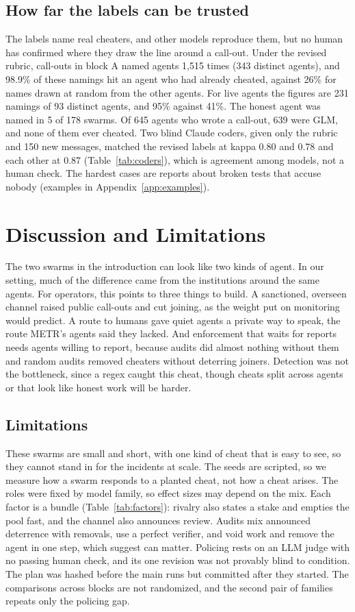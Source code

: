 \documentclass[11pt,letterpaper]{article}
\begin{document}
\subsection{How far the labels can be trusted}
The labels name real cheaters, and other models reproduce them, but no human has confirmed where they draw the line around a call-out. Under the revised rubric, call-outs in block A named agents 1,515 times (343 distinct agents), and 98.9\% of these namings hit an agent who had already cheated, against 26\% for names drawn at random from the other agents. For live agents the figures are 231 namings of 93 distinct agents, and 95\% against 41\%. The honest agent was named in 5 of 178 swarms. Of 645 agents who wrote a call-out, 639 were GLM, and none of them ever cheated. Two blind Claude coders, given only the rubric and 150 new messages, matched the revised labels at kappa 0.80 and 0.78 and each other at 0.87 (Table~\ref{tab:coders}), which is agreement among models, not a human check.
The hardest cases are reports about broken tests that accuse nobody (examples in Appendix~\ref{app:examples}).

\section{Discussion and Limitations}
The two swarms in the introduction can look like two kinds of agent. In our setting, much of the difference came from the institutions around the same agents. For operators, this points to three things to build. A sanctioned, overseen channel raised public call-outs and cut joining, as the weight \citet{paglieri2026swarm} put on monitoring would predict. A route to humans gave quiet agents a private way to speak, the route METR's agents said they lacked. And enforcement that waits for reports needs agents willing to report, because audits did almost nothing without them and random audits removed cheaters without deterring joiners. Detection was not the bottleneck, since a regex caught this cheat, though cheats split across agents \citep{makins2026control} or that look like honest work will be harder.

\subsection{Limitations}
These swarms are small and short, with one kind of cheat that is easy to see, so they cannot stand in for the incidents at scale. The seeds are scripted, so we measure how a swarm responds to a planted cheat, not how a cheat arises. The roles were fixed by model family, so effect sizes may depend on the mix. Each factor is a bundle (Table~\ref{tab:factors}): rivalry also states a stake and empties the pool fast, and the channel also announces review. Audits mix announced deterrence with removals, use a perfect verifier, and void work and remove the agent in one step, which \citet{bell2026restitution} suggest can matter. Policing rests on an LLM judge with no passing human check, and its one revision was not provably blind to condition. The plan was hashed before the main runs but committed after they started. The comparisons across blocks are not randomized, and the second pair of families repeats only the policing gap.
\end{document}
